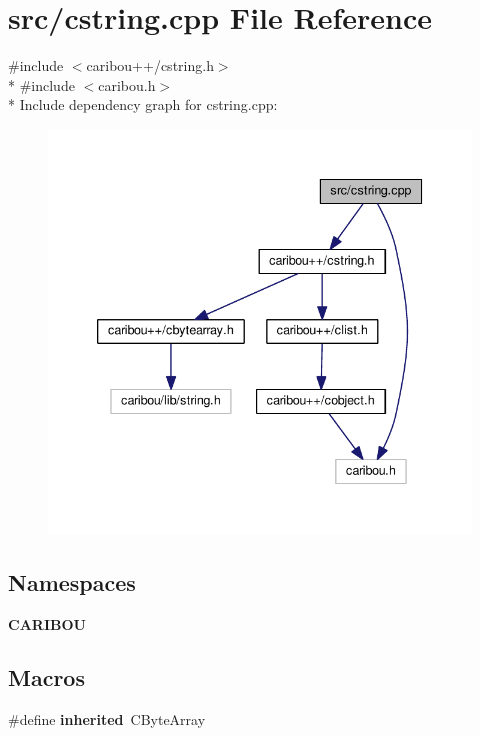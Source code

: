 \section{src/cstring.cpp File Reference}
\label{cstring_8cpp}
{\ttfamily \#include $<$caribou++/cstring.\+h$>$}\\*
{\ttfamily \#include $<$caribou.\+h$>$}\\*
Include dependency graph for cstring.\+cpp\+:
\nopagebreak
\begin{figure}[H]
\begin{center}
\leavevmode
\includegraphics[width=339pt]{cstring_8cpp__incl}
\end{center}
\end{figure}
\subsection*{Namespaces}
\begin{DoxyCompactItemize}
\item 
 {\bf C\+A\+R\+I\+B\+OU}
\end{DoxyCompactItemize}
\subsection*{Macros}
\begin{DoxyCompactItemize}
\item 
\#define {\bf inherited}~C\+Byte\+Array
\end{DoxyCompactItemize}


